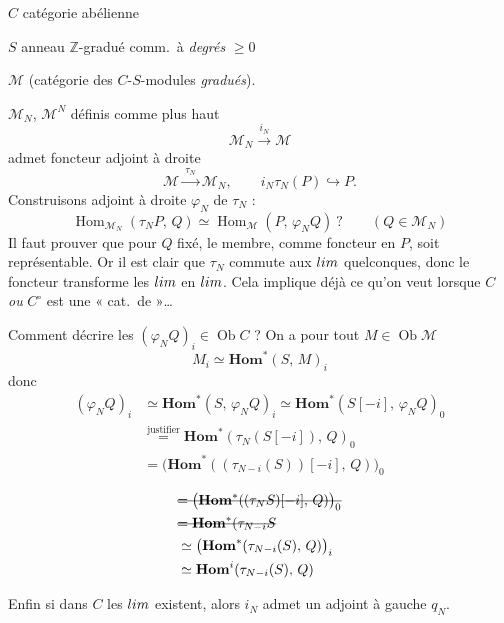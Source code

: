 \documentclass[11pt,a4paper]{article}
\begin{document}
$C$ catégorie abélienne

$S$ anneau $\mathbb{Z}$-gradué comm.\ à \emph{degrés} $\geq 0$

$\mathcal{M}$  (catégorie des $C$-$S$-modules \emph{gradués}).

$\mathcal{M}_N$, $\mathcal{M}^N$ définis comme plus haut
\[
\mathcal{M}_N \xrightarrow{\ i_N\ } \mathcal{M}
\]
admet foncteur adjoint à droite
\[
\mathcal{M} \xrightarrow{\ \tau_N\ } \mathcal{M}_N, \qquad i_N\tau_N(P)\hookrightarrow P .
\]
Construisons adjoint à droite $\varphi_N$ de $\tau_N$ :
\[
\operatorname{Hom}_{\mathcal{M}_N}(\tau_N P,\, Q) \simeq \operatorname{Hom}_{\mathcal{M}}(P,\, \varphi_N Q)\ ?
\qquad (Q\in\mathcal{M}_N)
\]
Il faut  prouver que pour $Q$ fixé, le  membre, comme foncteur en $P$, soit représentable. Or il est clair que $\tau_N$ commute aux $\varinjlim$ quelconques, donc le foncteur  transforme les $\varinjlim$ en $\varprojlim$. Cela implique déjà ce qu'on veut lorsque $C$ \emph{ou} $C^\circ$ est une « cat.\ de  »…

Comment  décrire les $(\varphi_N Q)_i\in\operatorname{Ob}C$ ? On a \struck{\ill{}} pour tout $M\in\operatorname{Ob}\mathcal{M}$
\[
M_i \simeq \mathbf{Hom}^*(S,\, M)_i
\]
donc
\[
\begin{aligned}
(\varphi_N Q)_i &\simeq \mathbf{Hom}^*(S,\, \varphi_N Q)_i \simeq \mathbf{Hom}^*(S[-i],\, \varphi_N Q)_0\\
&\overset{\text{justifier}}{=} \mathbf{Hom}^*(\tau_N(S[-i]),\, Q)_0\\
&= \bigl(\mathbf{Hom}^*((\tau_{N-i}(S))[-i],\, Q)\bigr)_0
\end{aligned}
\]

\[
\begin{aligned}
&\text{\struck{$=\bigl(\mathbf{Hom}^*((\tau_N S)[-i],\, Q)\bigr)_0$}}\\
&\text{\struck{$=\mathbf{Hom}^*(\tau_{N-i}S$}}\\
&\simeq \bigl(\mathbf{Hom}^*(\tau_{N-i}(S),\, Q)\bigr)_i\\
&\simeq \mathbf{Hom}^i(\tau_{N-i}(S),\, Q)
\end{aligned}
\]

Enfin si dans $C$ les $\varprojlim$ existent, alors $i_N$ admet un adjoint à gauche $q_N$.
\end{document}
